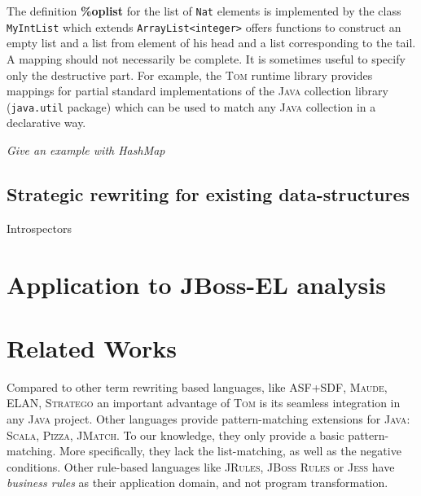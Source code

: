 \documentclass[runningheads]{llncs}
\newcommand{\scala}{\textsc{Scala}}
\newcommand{\pizza}{\textsc{Pizza}}
\newcommand{\jmatch}{\textsc{JMatch}}
\newcommand{\jbossrules}{\textsc{JBoss Rules}}
\newcommand{\jess}{\textsc{Jess}}
\newcommand{\jrules}{\textsc{JRules}}
\newcommand{\stratego}{\textsc{Stratego}}
\newcommand{\maude}{\textsc{Maude}\xspace}
\newcommand{\asfsdf}{{ASF+SDF}\xspace}
\newcommand{\elan}    {\textsf{ELAN}\xspace}
\newcommand{\tom}{\textsc{Tom}}
\newcommand{\java}{\textsc{Java}}
\newcommand{\lex}[1]{{\textrm{\textbf{#1}}}}
\begin{document}

	
The definition \lex{\%oplist} for the list of \texttt{Nat} elements is
implemented by the class \texttt{MyIntList} which extends
\texttt{ArrayList<integer>} offers functions to construct an empty list and a
list from element of his head and a list corresponding to the tail.  A mapping
should not necessarily be complete. It is sometimes useful to specify only the
destructive part. For example, the {\tom} runtime library provides mappings for
partial standard implementations of the {\java} collection library
(\texttt{java.util} package) which can be used to match any {\java} collection
in a declarative way.

\emph{Give an example with HashMap}

\subsection{Strategic rewriting for existing data-structures}

Introspectors

\section{Application to JBoss-EL analysis}

\section{Related Works}

Compared to other term rewriting based languages, like {\asfsdf}, {\maude},
{\elan}, {\stratego} an important advantage of {\tom} is its seamless
integration in any {\java} project. Other languages provide pattern-matching
extensions for {\java}: {\scala}, {\pizza}, {\jmatch}. To our knowledge, they
only provide a basic pattern-matching. More specifically, they lack the
list-matching, as well as the negative conditions. Other rule-based languages
like {\jrules}, {\jbossrules} or {\jess} have \emph{business rules} as their
application domain, and not program transformation.
\end{document}
